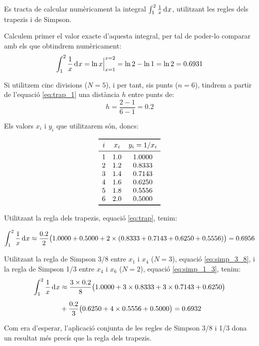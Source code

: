 \begin{exemple}\label{ex:IntegracioNum}
	\addcontentsxms{\IntegracioNum}
    Es tracta de calcular numèricament la integral $\int_1^2 \frac{1}{x} \diff x$, utilitzant les regles dels trapezis i de Simpson.

    Calculem primer el valor exacte d'aquesta integral, per tal de poder-lo comparar amb els que obtindrem  numèricament:
    \[
      \int_1^2 \frac{1}{x} \diff x = \ln x \Bigr|_{x=1}^{x=2} = \ln 2 - \ln 1 = \ln 2 = \num{0,6931}
    \]

    Si utilitzem cinc divisions ($N=5$), i per tant, sis punts ($n=6$), tindrem a partir de l'equació \eqref{eq:trap_1} una distància $h$ entre punts de:
    \[
        h = \frac{2-1}{6-1} = \num{0,2}
    \]

    Els valors $x_i$ i $y_i$ que utilitzarem són, doncs:
    \vspace{-8mm}
    \begin{center}
        \[\begin{array}{ccc}
           \toprule[1pt]
              i & x_i  & y_i = 1/x_i \\
           \midrule
              1 & \num{1,0} & \num{1,0000} \\
              2 & \num{1,2} & \num{0,8333} \\
              3 & \num{1,4} & \num{0,7143} \\
              4 & \num{1,6} & \num{0.6250} \\
              5 & \num{1,8} & \num{0.5556} \\
              6 & \num{2,0} & \num{0,5000} \\
           \bottomrule[1pt]
        \end{array} \]
    \end{center}

    \pagebreak
    Utilitzant la regla dels trapezis, equació \eqref{eq:trap}, tenim:

    \[
        \int_1^2 \frac{1}{x} \diff x \approx \frac{\num{0,2}}{2} \big(\num{1,0000}+\num{0,5000} +2 \times(\num{0,8333}+ \num{0,7143} +
        \num{0,6250} + \num{0,5556}) \big) = \num{0,6956}
    \]

    Utilitzant la regla de Simpson 3/8 entre $x_1$ i $x_4$ ($N=3$), equació \eqref{eq:simp_3_8}, i la  regla de Simpson 1/3 entre $x_4$ i $x_6$ ($N=2$), equació \eqref{eq:simp_1_3}, tenim:
    \[\begin{split}
        \int_1^2 \frac{1}{x} \diff x &\approx \frac{3\times\num{0,2}}{8} \big(\num{1,0000}+3\times\num{0,8333} +3\times \num{0,7143} +
        \num{0,6250} \big) \\[0.5em]
        {}&+ \frac{\num{0,2}}{3} \big(\num{0,6250} +4\times \num{0,5556} + \num{0,5000} \big)
        = \num{0,6932}
    \end{split}\]

    Com era d'esperar, l'aplicació conjunta de les regles de Simpson 3/8 i 1/3 dona un resultat més precís que la regla dels trapezis.
\end{exemple}



